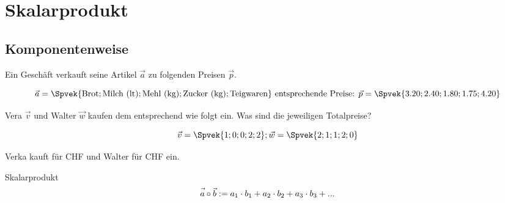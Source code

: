 \section{Skalarprodukt}




\subsection{Komponentenweise}


Ein Geschäft verkauft seine Artikel $\vec{a}$ zu folgenden Preisen $\vec{p}$.

$$
\vec{a} = \Spvek{\text{Brot};\text{Milch (lt)}; \text{Mehl (kg)}; \text{Zucker
    (kg)}; \text{Teigwaren}}
\text{ entsprechende Preise: }
\vec{p} = \Spvek{3.20; 2.40; 1.80; 1.75; 4.20}
$$

Vera $\vec{v}$ und Walter $\vec{w}$ kaufen dem entsprechend wie folgt ein. Was sind die
jeweiligen Totalpreise?

$$\vec{v} = \Spvek{1;0;0;2;2}; \vec{w} = \Spvek{2;1;1;2;0} $$


\vspace{3mm}
Verka kauft für CHF  und Walter für CHF
 ein.

\newpage

\begin{definition}{Skalarprodukt}{}
  $$\vec{a\vphantom{b}}\circ\vec{b} := a_1\cdot{}b_1 + a_2 \cdot{} b_2
  + a_3\cdot{}b_3 + ...$$
\end{definition}

